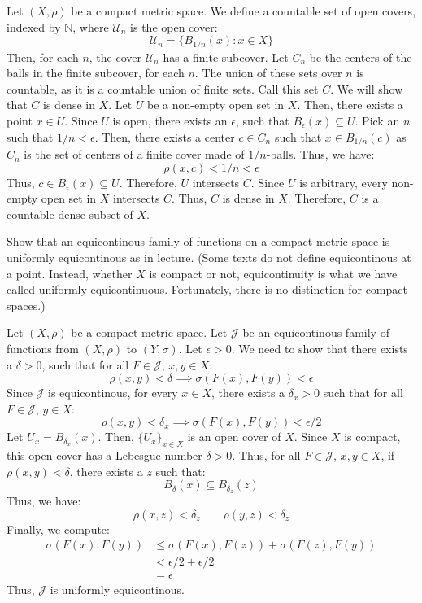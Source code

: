 \documentclass[12pt]{article}
\begin{document}
\begin{solution}
    Let $(X, \rho)$ be a compact metric space. We define a countable set of open covers, indexed by $\mathbb{N}$, where $\mathcal{U}_n$ is the open cover: 
    \[ \mathcal{U}_n = \{ B_{1/n}(x) : x \in X\} \] 
    Then, for each $n$, the cover $\mathcal{U}_n$ has a finite subcover. Let $C_n$ be the centers of the balls in the finite subcover, for each $n$. The union of these sets over $n$ is countable, as it is a countable union of finite sets. Call this set $C$. We will show that $C$ is dense in $X$. \bbni
    Let $U$ be a non-empty open set in $X$. Then, there exists a point $x \in U$. Since $U$ is open, there exists an $\epsilon$, such that $B_\epsilon(x) \subseteq U$. Pick an $n$ such that $1/n < \epsilon$. Then, there exists a center $c \in C_n$ such that $x \in B_{1/n}(c)$ as $C_n$ is the set of centers of a finite cover made of $1/n$-balls. Thus, we have:
    \[\rho(x, c) < 1/n < \epsilon\]
    Thus, $c \in B_\epsilon(x) \subseteq U$. Therefore, $U$ intersects $C$. Since $U$ is arbitrary, every non-empty open set in $X$ intersects $C$. Thus, $C$ is dense in $X$. Therefore, $C$ is a countable dense subset of $X$.
\end{solution}
\newpage

\begin{problem}{5}
    Show that an equicontinous family of functions on a compact metric space is uniformly equicontinous as in lecture. (Some texts do not define equicontinous at a point. Instead, whether $X$ is compact or not, equicontinuity is what we have called uniformly equicontinuous. Fortunately, there is no distinction for compact spaces.)
\end{problem}

\begin{solution}
    Let $(X,\rho)$ be a compact metric space. Let $\mathcal{J}$ be an equicontinous family of functions from $(X, \rho)$ to $(Y, \sigma)$. Let $\epsilon > 0$. We need to show that there exists a $\delta > 0$, such that for all $F \in \mathcal{J}$, $x, y \in X$:
    \[\rho(x,y) < \delta \implies \sigma(F(x), F(y)) < \epsilon \]
    Since $\mathcal{J}$ is equicontinous, for every $x \in X$, there exists a $\delta_x > 0$ such that for all $F \in \mathcal{J}$, $y \in X$:
    \[\rho(x,y) < \delta_x \implies \sigma(F(x), F(y)) < \epsilon/2 \]
    Let $U_x = B_{\delta_x}(x)$. Then, $\{U_x\}_{x \in X}$ is an open cover of $X$. Since $X$ is compact, this open cover has a Lebesgue number $\delta > 0$. Thus, for all $F \in \mathcal{J}$, $x, y \in X$, if $\rho(x,y) < \delta$, there exists a $z$ such that:
    \[B_\delta(x) \subseteq B_{\delta_z}(z)\]
    Thus, we have:
    \[\rho(x,z) < \delta_z \qquad \rho(y,z) < \delta_z \]
    Finally, we compute:
    \begin{align*}
        \sigma(F(x), F(y)) &\leq \sigma(F(x), F(z)) + \sigma(F(z), F(y)) \\
        &< \epsilon/2 + \epsilon/2 \\
        &= \epsilon
    \end{align*}
    Thus, $\mathcal{J}$ is uniformly equicontinous.
\end{solution}
\newpage 
\end{document}
